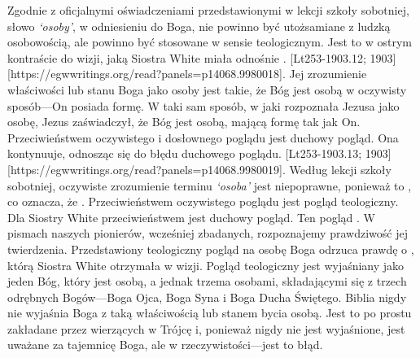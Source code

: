 Zgodnie z oficjalnymi oświadczeniami przedstawionymi w lekcji szkoły sobotniej, słowo \textit{‘osoby’},\textit{ }w odniesieniu do Boga, nie powinno być utożsamiane z ludzką osobowością, ale powinno być stosowane w sensie teologicznym. Jest to w ostrym kontraście do wizji, jaką Siostra White miała odnośnie . [Lt253-1903.12; 1903][https://egwwritings.org/read?panels=p14068.9980018]. Jej zrozumienie właściwości lub stanu Boga jako osoby jest takie, że Bóg jest osobą w oczywisty sposób—On posiada formę. W taki sam sposób, w jaki rozpoznała Jezusa jako osobę, Jezus zaświadczył, że Bóg jest osobą, mającą formę tak jak On. Przeciwieństwem oczywistego i dosłownego poglądu jest duchowy pogląd. Ona kontynuuje, odnosząc się do błędu duchowego poglądu. [Lt253-1903.13; 1903][https://egwwritings.org/read?panels=p14068.9980019]. Według lekcji szkoły sobotniej, oczywiste zrozumienie terminu \textit{‘osoba’ }jest niepoprawne, ponieważ to , co oznacza, że . Przeciwieństwem oczywistego poglądu jest pogląd teologiczny. Dla Siostry White przeciwieństwem jest duchowy pogląd. Ten pogląd . W pismach naszych pionierów, wcześniej zbadanych, rozpoznajemy prawdziwość jej twierdzenia. Przedstawiony teologiczny pogląd na osobę Boga odrzuca prawdę o , którą Siostra White otrzymała w wizji. Pogląd teologiczny jest wyjaśniany jako jeden Bóg, który jest osobą, a jednak trzema osobami, składającymi się z trzech odrębnych Bogów—Boga Ojca, Boga Syna i Boga Ducha Świętego. Biblia nigdy nie wyjaśnia Boga z taką właściwością lub stanem bycia osobą. Jest to po prostu zakładane przez wierzących w Trójcę i, ponieważ nigdy nie jest wyjaśnione, jest uważane za tajemnicę Boga, ale w rzeczywistości—jest to błąd.

